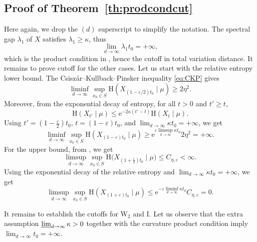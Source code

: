 \documentclass[10pt,reqno]{amsart}
\numberwithin{equation}{section}
\begin{document}
\subsection{Proof of Theorem~\ref{th:prodcondcut}} 
Here again, we drop the $(d)$ superscript to simplify the notation. The
spectral gap $\lambda_1$ of $X$ satisfies $\lambda_1\geq\kappa$, thus
\begin{equation}
    \lim_{d\to\infty}\lambda_1t_0=+\infty,
\end{equation}
which is the product condition in \cite[Cor.~1]{salez-2025}, hence the cutoff in total variation distance. It remains to prove cutoff for the other cases. Let us start with the relative entropy lower bound. The Csiszár--Kullback--Pinsker inequality \eqref{eq:CKP} gives  
\begin{equation}
 \liminf_{d\to\infty}
 \sup_{x_0\in S}
 \mathrm{H}(X_{(1-\varepsilon/2)t_0}\mid\mu) \geq 2\eta^2.
\end{equation}
Moreover, from the exponential decay of entropy, for all $t>0$ and $t'\geq t$,
\begin{equation}
\mathrm{H}(X_{t'}\mid\mu)
\leq\mathrm{e}^{-2\kappa(t'-t)}\mathrm{H}(X_{t}\mid\mu).
\end{equation}
Using $t' = (1-\frac{\varepsilon}{2})t_0$, $t = (1-\varepsilon)t_0$, and
$\lim_{d\to\infty}\kappa t_0=+\infty$, we get 
\begin{equation}
  \liminf_{d\to\infty}\sup_{x_0\in S}\mathrm{H}(X_{(1-\varepsilon)t_0}\mid\mu)
  \geq\mathrm{e}^{\varepsilon\limsup_{d\to\infty}\kappa t_0}
  2\eta^2=+\infty.
\end{equation}
For the upper bound, from \cite[Proof of Th.~1]{salez-2025}, we get
\begin{equation}
\limsup_{d\to\infty}\sup_{x_0\in S}\mathrm{H}\bigl(X_{(1+\frac{\varepsilon}{2})t_0}\mid\mu\bigr) 
\leq C_{\eta,\varepsilon}<\infty.
\end{equation}
Using the exponential decay of the relative entropy and
$\lim_{d\to\infty}\kappa t_0=+\infty$, we get
\begin{equation}
    \limsup_{d\to\infty}\sup_{x_0\in S}\mathrm{H}(X_{(1+\varepsilon)t_0}\mid\mu)
    \leq\mathrm{e}^{-\varepsilon\liminf_{d\to\infty}\kappa t_0}
    C_{\eta,\varepsilon}
    =0.
\end{equation}

It remains to establish the cutoffs for $\mathrm{W}_2$ and $\mathrm{I}$. Let
us observe that the extra assumption $\varliminf_{d\to\infty}\kappa>0$
together with the curvature product condition imply
$\lim_{d\to\infty}t_0=+\infty$.
\end{document}
